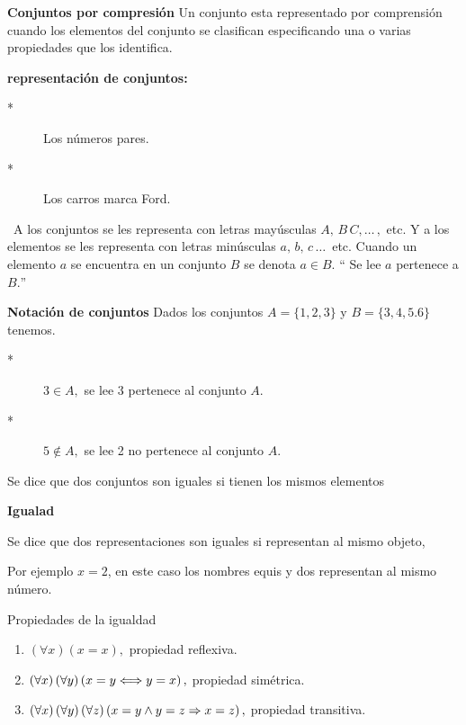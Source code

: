 \vspace*{-70pt}\begin{ideabox}{\bf Conjuntos por compresión} Un
conjunto esta representado por comprensión cuando los elementos del
conjunto se clasifican especificando una o varias propiedades que
los identifica.\end{ideabox}

\begin{ejemplo}{\bf representación de conjuntos:} 
\begin{description}
\item [{{*}}] Los números pares.
\item [{{*}}] Los carros marca Ford.
\end{description}
\end{ejemplo}

\notacion\ A los conjuntos se les representa con letras mayúsculas
$A,\,B\,C,\dots\,,$ etc. Y a los elementos se les representa con
letras minúsculas $a,\,b,\,c\,\dots\,$ etc. Cuando un elemento $a$
se encuentra en un conjunto $B$ se denota $a\in B.$ `` Se lee $a$
pertenece a $B.$'' 

\begin{ejemplo}{\bf Notación de conjuntos} Dados los conjuntos
$A=\{1,2,3\}$ y $B=\{3,4,5.6\}$ tenemos.
\begin{description}
\item [{{*}}] $3\in A,$ se lee 3 pertenece al conjunto $A.$
\item [{{*}}] $5\notin A,$ se lee 2 no pertenece al conjunto $A.$
\end{description}
\end{ejemplo}

\obs Se dice que dos conjuntos son iguales si tienen los mismos elementos

\vspace*{-70pt}\begin{ideabox}{\bf Igualad}\label{tii}

Se dice que dos representaciones son iguales si representan al mismo
objeto,

\end{ideabox}

Por ejemplo $x=2$, en este caso los nombres equis y dos representan
al mismo número.

\vspace*{20pt}\begin{axioma}{Propiedades de la igualdad}{}\label{ax:igualdad}
\begin{enumerate}
\item $\left(\forall x\right)\left(x=x\right),$ propiedad reflexiva.
\item $\left(\forall x\right)\left(\text{\ensuremath{\forall}\ensuremath{y}}\right)\left(x=y\Longleftrightarrow y=x\right),$
propiedad simétrica.
\item $\left(\forall x\right)\left(\text{\ensuremath{\forall}\ensuremath{y}}\right)\left(\forall z\right)\left(x=y\wedge y=z\Rightarrow x=z\right),$
propiedad transitiva.
\end{enumerate}
\end{axioma}

